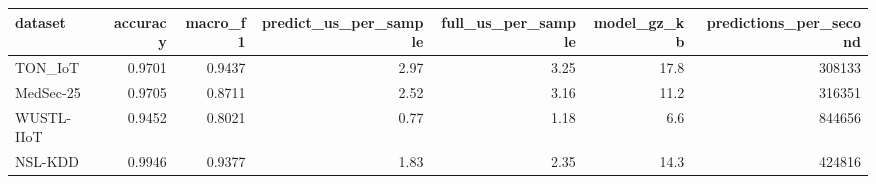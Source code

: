 \begin{tabular}{lrrrrrr}
\toprule
dataset & accuracy & macro\_f1 & predict\_us\_per\_sample & full\_us\_per\_sample & model\_gz\_kb & predictions\_per\_second \\
\midrule
TON\_IoT & 0.9701 & 0.9437 & 2.97 & 3.25 & 17.8 & 308133 \\
MedSec-25 & 0.9705 & 0.8711 & 2.52 & 3.16 & 11.2 & 316351 \\
WUSTL-IIoT & 0.9452 & 0.8021 & 0.77 & 1.18 & 6.6 & 844656 \\
NSL-KDD & 0.9946 & 0.9377 & 1.83 & 2.35 & 14.3 & 424816 \\
\bottomrule
\end{tabular}
